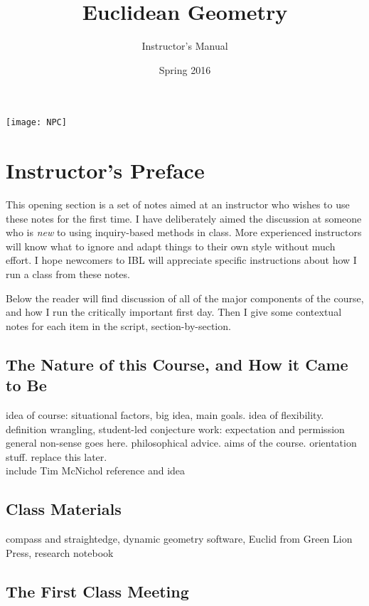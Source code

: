 \documentclass{tufte-handout}
\title{Euclidean Geometry}
\author[Instructor's Manual]{Instructor's Manual}
\date{Spring 2016}
\theoremstyle{definition}
\begin{document}
\maketitle

\begin{marginfigure}
    \texttt{[image: NPC]}
\end{marginfigure}


\setcounter{section}{0}
\setcounter{problem}{0}
\section{Instructor's Preface}

This opening section is a set of notes aimed at an instructor who wishes to use these notes for the first time.
I have deliberately aimed the discussion at someone who is \emph{new} to using inquiry-based methods in class.
More experienced instructors will know what to ignore and adapt things to their own style without much effort.
I hope newcomers to IBL will appreciate specific instructions about how I run a class from these notes.

Below the reader will find discussion of all of the major components of the course, and how I run the critically important first day.
Then I give some contextual notes for each item in the script, section-by-section.

\subsection{The Nature of this Course, and How it Came to Be}

idea of course: situational factors, big idea, main goals. idea of flexibility. definition wrangling, student-led conjecture work: expectation and permission\\

general non-sense goes here. philosophical advice. aims of the course. orientation stuff.  replace this later.\\

include Tim McNichol reference and idea

\subsection{Class Materials}

compass and straightedge, dynamic geometry software, Euclid from Green Lion Press, 
research notebook


\subsection{The First Class Meeting}
\end{document}
